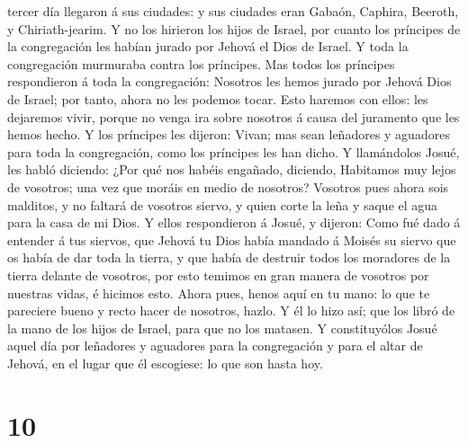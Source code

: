 tercer día llegaron á sus ciudades: y sus ciudades eran Gabaón, Caphira,
Beeroth, y Chiriath-jearim.  Y no los hirieron los hijos
de Israel, por cuanto los príncipes de la congregación les habían jurado
por Jehová el Dios de Israel. Y toda la congregación murmuraba contra
los príncipes.  Mas todos los príncipes respondieron á
toda la congregación: Nosotros les hemos jurado por Jehová Dios de
Israel; por tanto, ahora no les podemos tocar.  Esto
haremos con ellos: les dejaremos vivir, porque no venga ira sobre
nosotros á causa del juramento que les hemos hecho.  Y
los príncipes les dijeron: Vivan; mas sean leñadores y aguadores para
toda la congregación, como los príncipes les han dicho. 
Y llamándolos Josué, les habló diciendo: ¿Por qué nos habéis engañado,
diciendo, Habitamos muy lejos de vosotros; una vez que moráis en medio
de nosotros?  Vosotros pues ahora sois malditos, y no
faltará de vosotros siervo, y quien corte la leña y saque el agua para
la casa de mi Dios.  Y ellos respondieron á Josué, y
dijeron: Como fué dado á entender á tus siervos, que Jehová tu Dios
había mandado á Moisés su siervo que os había de dar toda la tierra, y
que había de destruir todos los moradores de la tierra delante de
vosotros, por esto temimos en gran manera de vosotros por nuestras
vidas, é hicimos esto.  Ahora pues, henos aquí en tu
mano: lo que te pareciere bueno y recto hacer de nosotros, hazlo.
 Y él lo hizo así; que los libró de la mano de los hijos
de Israel, para que no los matasen.  Y constituyólos
Josué aquel día por leñadores y aguadores para la congregación y para el
altar de Jehová, en el lugar que él escogiese: lo que son hasta hoy.

\hypertarget{section-9}{%
\section{10}\label{section-9}}

